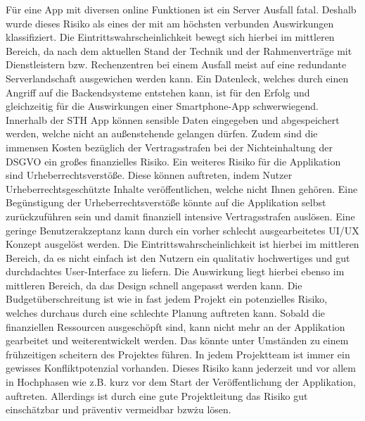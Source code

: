Für eine App mit diversen online Funktionen ist ein Server Ausfall fatal. Deshalb wurde dieses Risiko als eines der mit am höchsten verbunden Auswirkungen klassifiziert. Die Eintrittswahrscheinlichkeit bewegt sich hierbei im mittleren Bereich, da nach dem aktuellen Stand der Technik und der Rahmenverträge mit Dienstleistern bzw. Rechenzentren bei einem Ausfall meist auf eine redundante Serverlandschaft ausgewichen werden kann. Ein Datenleck, welches durch einen Angriff auf die Backendsysteme entstehen kann, ist für den Erfolg und gleichzeitig für die Auswirkungen einer Smartphone-App schwerwiegend. Innerhalb der STH App können sensible Daten eingegeben und abgespeichert werden, welche nicht an außenstehende gelangen dürfen. Zudem sind die immensen Kosten bezüglich der Vertragsstrafen bei der Nichteinhaltung der DSGVO ein großes finanzielles Risiko. Ein weiteres Risiko für die Applikation sind Urheberrechtsverstöße. Diese können auftreten, indem Nutzer Urheberrechtsgeschützte Inhalte veröffentlichen, welche nicht Ihnen gehören. Eine Begünstigung der Urheberrechtsverstöße könnte auf die Applikation selbst zurückzuführen sein und damit finanziell intensive Vertragsstrafen auslösen. Eine geringe Benutzerakzeptanz kann durch ein vorher schlecht ausgearbeitetes UI/UX Konzept ausgelöst werden. Die Eintrittswahrscheinlichkeit ist hierbei im mittleren Bereich, da es nicht einfach ist den Nutzern ein qualitativ hochwertiges und gut durchdachtes User-Interface zu liefern. Die Auswirkung liegt hierbei ebenso im mittleren Bereich, da das Design schnell angepasst werden kann. Die Budgetüberschreitung ist wie in fast jedem Projekt ein potenzielles Risiko, welches durchaus durch eine schlechte Planung auftreten kann. Sobald die finanziellen Ressourcen ausgeschöpft sind, kann nicht mehr an der Applikation gearbeitet und weiterentwickelt werden. Das könnte unter Umständen zu einem frühzeitigen scheitern des Projektes führen. In jedem Projektteam ist immer ein gewisses Konfliktpotenzial vorhanden. Dieses Risiko kann jederzeit und vor allem in Hochphasen wie z.B. kurz vor dem Start der Veröffentlichung der Applikation, auftreten. Allerdings ist durch eine gute Projektleitung das Risiko gut einschätzbar und präventiv vermeidbar bzw\. zu lösen.


